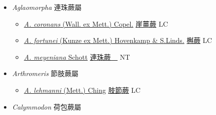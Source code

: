 
  \begin{itemize}
 \item[] \textit{Aglaomorpha} 連珠蕨屬
                    
  \begin{itemize}
        \item[] \href{http://www.theplantlist.org/tpl1.1/search?q=Aglaomorpha+coronans}{\textit{A. coronans} (Wall. ex Mett.) Copel.}     \href{\detokenize{http://taibnet.sinica.edu.tw/chi/taibnet_species_list.php?T2=崖薑蕨&T2_new_value=true&fr=y}}{崖薑蕨} LC
        \item[] \href{http://www.theplantlist.org/tpl1.1/search?q=Aglaomorpha+fortunei}{\textit{A. fortunei} (Kunze ex Mett.) Hovenkamp \& S.Linds.}     \href{\detokenize{http://taibnet.sinica.edu.tw/chi/taibnet_species_list.php?T2=槲蕨&T2_new_value=true&fr=y}}{槲蕨} LC
        \item[] \href{http://www.theplantlist.org/tpl1.1/search?q=Aglaomorpha+meyeniana}{\textit{A. meyeniana} Schott}   \href{\detokenize{http://taibnet.sinica.edu.tw/chi/taibnet_species_list.php?T2=連珠蕨　&T2_new_value=true&fr=y}}{連珠蕨　} NT
  \end{itemize}
 \item[] \textit{Arthromeris} 節肢蕨屬
                    
  \begin{itemize}
        \item[] \href{http://www.theplantlist.org/tpl1.1/search?q=Arthromeris+lehmanni}{\textit{A. lehmanni} (Mett.) Ching}   \href{\detokenize{http://taibnet.sinica.edu.tw/chi/taibnet_species_list.php?T2=肢節蕨&T2_new_value=true&fr=y}}{肢節蕨} LC
  \end{itemize}
 \item[] \textit{Calymmodon} 荷包蕨屬
                    

\end{itemize}
